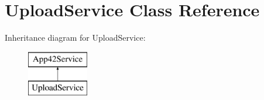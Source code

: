 \hypertarget{class_upload_service}{\section{Upload\+Service Class Reference}
\label{class_upload_service}
}
Inheritance diagram for Upload\+Service\+:\begin{figure}[H]
\begin{center}
\leavevmode
\includegraphics[height=2.000000cm]{class_upload_service}
\end{center}
\end{figure}
